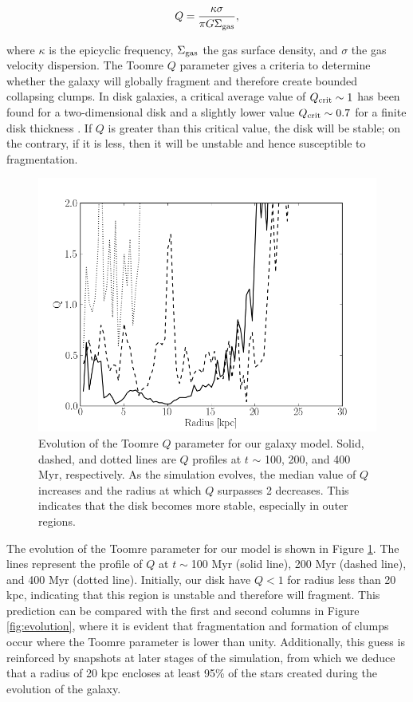 \documentclass[twocolumn]{aastex}
\newcommand{\sgas}{\Sigma_{\rm gas}}
\begin{document}
	\begin{equation}
	Q=\frac{\kappa \sigma}{\pi G \sgas},
	\label{eq:toomreQ}
	\end{equation}

\noindent where $\kappa$ is the epicyclic frequency, $\sgas$ the gas surface density, and $\sigma$ the gas velocity dispersion. The Toomre $Q$ parameter gives a criteria to determine whether the galaxy will globally fragment and therefore create bounded collapsing clumps. In disk galaxies, a critical average value of $Q_{\rm crit} \sim 1$ has been found for a two-dimensional disk \citep{Toomre_64} and a slightly lower value $Q_{\rm crit} \sim 0.7$ for a finite disk thickness \citep{Goldreich_65}. If $Q$ is greater than this critical value, the disk will be stable; on the contrary, if it is less, then it will be unstable and hence susceptible to fragmentation.

	\begin{figure}[h!]
	\begin{center}
	\includegraphics[scale=0.5]{./f2.png}
	\caption{Evolution of the Toomre $Q$ parameter for our galaxy model. Solid, dashed, and dotted lines are $Q$ profiles at $t$ $\sim$ 100, 200, and 400 Myr, respectively. As the simulation evolves, the median value of $Q $increases and the radius at which $Q$ surpasses 2 decreases. This indicates that the disk becomes more stable, especially in outer regions.}
	\label{fig:Qvst}
	\end{center}
	\end{figure}

The evolution of the Toomre parameter for our model is shown in Figure \ref{fig:Qvst}. The lines represent the profile of $Q$ at $t \sim$100 Myr (solid line), 200 Myr (dashed line), and 400 Myr (dotted line). Initially, our disk have $Q < 1$ for radius less than 20 kpc, indicating that this region is unstable and therefore will fragment. This prediction can be compared with the first and second columns in Figure \ref{fig:evolution}, where it is evident that fragmentation and formation of clumps occur where the Toomre parameter is lower than unity. Additionally, this guess is reinforced by snapshots at later stages of the simulation, from which we deduce that a radius of 20 kpc encloses at least 95\% of the stars created during the evolution of the galaxy.
\end{document}
